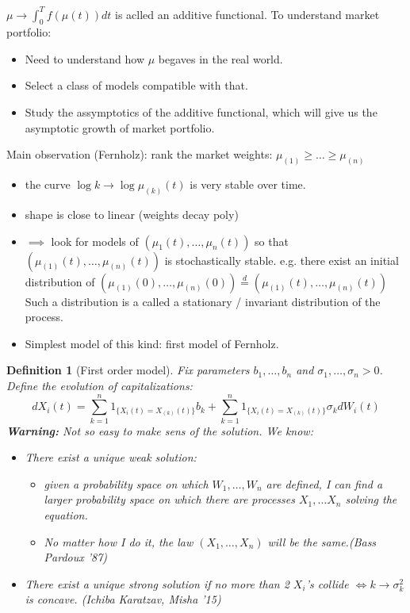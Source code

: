 \documentclass{article} \usepackage[utf8]{inputenc}
\newtheorem{definition}{Definition}
\begin{document}
  $\mu \rightarrow \int_0^T f(\mu(t))dt$ is aclled an additive functional.
  To understand market portfolio:
  \begin{itemize}
  \item Need to understand how $\mu$ begaves in the real world.
  \item Select a class of models compatible with that.
  \item Study the assymptotics of the additive functional, which will give us the asymptotic growth of market portfolio.
  \end{itemize}

  Main observation (Fernholz): rank the market weights: $\mu_{(1)} \ge \ldots \ge \mu_{(n)}$
  \begin{itemize}
  \item the curve $\log k \rightarrow \log \mu_{(k)}(t)$ is very stable over time.
  \item shape is close to linear (weights decay poly)
  \item $\implies$ look for models of $(\mu_1(t), \ldots, \mu_n(t))$ so that $(\mu_{(1)}(t), \ldots, \mu_{(n)}(t))$ is stochastically stable. e.g. there exist an initial distribution of $(\mu_{(1)}(0), \ldots, \mu_{(n)}(0)) \overset{d}{=} (\mu_{(1)}(t), \ldots, \mu_{(n)}(t))$
    Such a distribution is a called a stationary / invariant distribution of the process.
  \item Simplest model of this kind: first model of Fernholz. 
  \end{itemize}
  \begin{definition}[First order model]
    Fix parameters $b_1, \ldots, b_n$ and $\sigma_1, \ldots, \sigma_n > 0$.
    Define the evolution of capitalizations:
    $$dX_i(t) = \sum_{k = 1}^n 1_{\{X_i(t) = X_{(k)}(t)\}} b_k + \sum_{k = 1}^n 1_{\{X_i(t) = X_{(k)}(t)\}} \sigma_k dW_i(t)$$
    \textbf{Warning:} Not so easy to make sens of the solution.
    We know:
    \begin{itemize}
    \item There exist a unique \textit{weak} solution:
      \begin{itemize}
      \item given a probability space on which $W_1, \ldots, W_n$ are defined, I can find a larger probability space on which  there are processes $X_1, \ldots X_n$ solving the equation.
      \item No matter how I do it, the law $(X_1, \ldots, X_n)$ will be the same.(Bass Pardoux '87)

      \end{itemize}
    \item There exist a unique \textit{strong} solution if no more than 2 $X_i$'s collide $\iff k\rightarrow \sigma_k^2$ is concave. (Ichiba Karatzav, Misha '15)
    \end{itemize}
  \end{definition}
\end{document}
